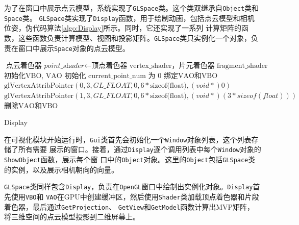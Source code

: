 \par 为了在窗口中展示点云模型，系统实现了\texttt{GLSpace}类。这个类双继承自\texttt{Object}类和\texttt{Space}类。
\texttt{GLSpace}类实现了\texttt{Display}函数，用于绘制动画，包括点云模型和相机位姿，伪代码算法\ref{algo:Display}所示。同时，它还实现了一系列
计算矩阵的函数，这些函数负责计算模型、视图和投影矩阵。\texttt{GLSpace}类只实例化一个对象，负责在窗口中展示\texttt{Space}对象的点云模型。

\begin{algorithm}[htbp]
	\SetAlgoLined
	$\textit{点云着色器 point\_shader} \gets \text{顶点着色器 vertex\_shader，片元着色器 fragment\_shader}$\;
	$\text{初始化VBO, VAO}$\;
	$\text{初始化 current\_point\_num 为 0}$\;
	$\text{绑定VAO和VBO}$\;
	$\text{glVertexAttribPointer}(0, 3, GL\_FLOAT, 0, 6 * \text{sizeof(float)}, (void *)0)$\;
	$\text{glVertexAttribPointer}(1, 3, GL\_FLOAT, 0, 6 * \text{sizeof(float)}, (void *)(3 * sizeof(float)))$\;
	$\text{删除VAO和VBO}$\;
	\caption{Display}
	\label{algo:Display}
\end{algorithm}

\par 在可视化模块开始运行时，\texttt{Gui}类首先会初始化一个\texttt{Window}对象列表，这个列表存储了所有需要
展示的窗口。接着，通过\texttt{Display}逐个调用列表中每个\texttt{Window}对象的\texttt{ShowObject}函数，展示每个窗
口中的\texttt{Object}对象。这里的\texttt{Object}包括\texttt{GLSpace}类的实例，以及展示相机朝向的向量。

\par \texttt{GLSpace}类同样包含\texttt{Display}，负责在\texttt{OpenGL}窗口中绘制出实例化对象。\texttt{Display}首先使用\texttt{VBO}和
\texttt{VAO}在GPU中创建缓冲区，然后使用\texttt{Shader}类加载顶点着色器和片段着色器，最后通过\texttt{GetProjection}、
\texttt{GetView}和\texttt{GetModel}函数计算出MVP矩阵，将三维空间的点云模型投影到二维屏幕上。


